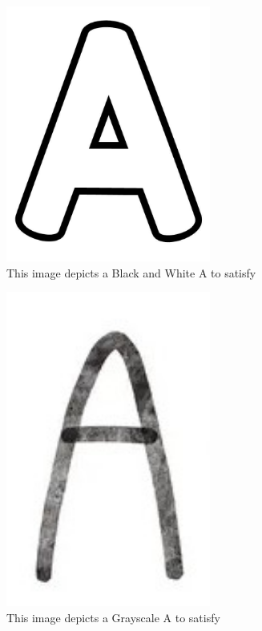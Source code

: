 \documentclass[12pt, titlepage]{article}
\begin{document}
\begin{figure}[h!]
  \begin{center}
    \includegraphics[width=0.6\textwidth]{bandwA}
  \caption{This image depicts a Black and White A to satisfy}
  \label{Fig_BWA} 
  \end{center}
  \end{figure}

\begin{figure}[h!]
  \begin{center}
    \includegraphics[width=0.6\textwidth]{grayscaleA}
  \caption{This image depicts a Grayscale A to satisfy}
  \label{Fig_grayA} 
  \end{center}
  \end{figure}
\end{document}
